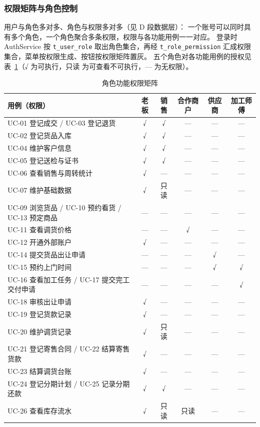 \documentclass[12pt, a4paper]{ctexart}
\newcommand{\code}[1]{\texttt{\small #1}}
\begin{document}
\subsubsection{权限矩阵与角色控制}

用户与角色多对多、角色与权限多对多（见 D 段数据层）：
一个账号可以同时具有多个角色，一个角色聚合多条权限，权限与各功能用例一一对应。
登录时 AuthService 按 \code{t\_user\_role} 取出角色集合，再经 \code{t\_role\_permission}
汇成权限集合，菜单按权限生成、按钮按权限矩阵置灰。
五个角色对各功能用例的授权见表~\ref{tab:perm}（√ 为可执行，只读 为可查看不可执行，— 为无权限）。

\begin{table}[H]
\centering
\small
\caption{角色功能权限矩阵}
\label{tab:perm}
\begin{tabularx}{\textwidth}{@{}X c c c c c@{}}
\toprule
用例（权限） & 老板 & 销售 & 合作商户 & 供应商 & 加工师傅 \\
\midrule
UC-01 登记成交 / UC-03 登记退货 & √ & √ & — & — & — \\
UC-02 登记货品入库 & √ & √ & — & — & — \\
UC-04 维护客户信息 & √ & √ & — & — & — \\
UC-05 登记送检与证书 & √ & √ & — & — & — \\
UC-06 查看销售与周转统计 & √ & — & — & — & — \\
UC-07 维护基础数据 & √ & 只读 & — & — & — \\
UC-09 浏览货品 / UC-10 预约看货 / UC-13 预定商品 & — & — & — & — & — \\
UC-11 查看调货价格 & — & — & √ & — & — \\
UC-12 开通外部账户 & √ & — & — & — & — \\
UC-14 提交货品出让申请 & — & — & — & √ & — \\
UC-15 预约上门时间 & — & — & — & √ & √ \\
UC-16 查看加工任务 / UC-17 提交完工交付申请 & — & — & — & — & √ \\
UC-18 审核出让申请 & √ & — & — & — & — \\
UC-19 登记货款记录 & √ & — & — & — & — \\
UC-20 维护调货记录 & √ & 只读 & — & — & — \\
UC-21 登记寄售合同 / UC-22 结算寄售货款 & √ & — & — & — & — \\
UC-23 结算调货台账 & √ & — & — & — & — \\
UC-24 登记分期计划 / UC-25 记录分期还款 & √ & √ & — & — & — \\
UC-26 查看库存流水 & √ & 只读 & 只读 & — & — \\
\bottomrule
\end{tabularx}
\end{table}
\end{document}
